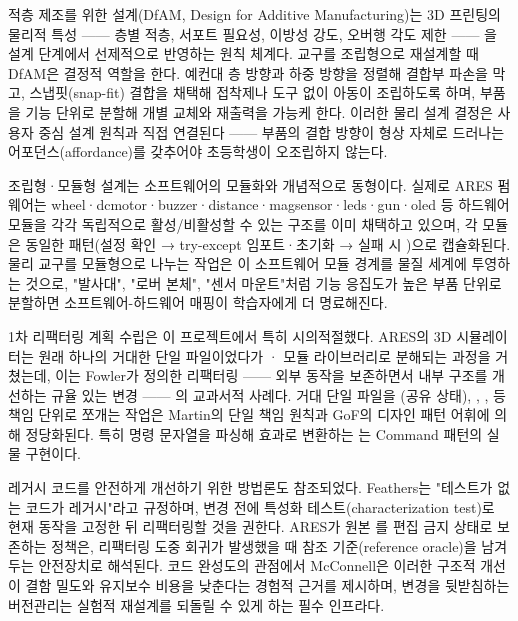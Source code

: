 적층 제조를 위한 설계(DfAM, Design for Additive Manufacturing)는 3D 프린팅의 물리적 특성 —— 층별 적층, 서포트 필요성, 이방성 강도, 오버행 각도 제한 —— 을 설계 단계에서 선제적으로 반영하는 원칙 체계다. 교구를 조립형으로 재설계할 때 DfAM은 결정적 역할을 한다. 예컨대 층 방향과 하중 방향을 정렬해 결합부 파손을 막고, 스냅핏(snap-fit) 결합을 채택해 접착제나 도구 없이 아동이 조립하도록 하며, 부품을 기능 단위로 분할해 개별 교체와 재출력을 가능케 한다. 이러한 물리 설계 결정은 사용자 중심 설계 원칙\cite{norman2013design}과 직접 연결된다 —— 부품의 결합 방향이 형상 자체로 드러나는 어포던스(affordance)를 갖추어야 초등학생이 오조립하지 않는다.

조립형·모듈형 설계는 소프트웨어의 모듈화와 개념적으로 동형이다. 실제로 ARES 펌웨어는 wheel·dcmotor·buzzer·distance·magsensor·leds·gun·oled 등 하드웨어 모듈을 각각 독립적으로 활성/비활성할 수 있는 구조를 이미 채택하고 있으며\cite{ares-repo}, 각 모듈은 동일한 패턴(설정 확인 → try-except 임포트·초기화 → 실패 시 )으로 캡슐화된다. 물리 교구를 모듈형으로 나누는 작업은 이 소프트웨어 모듈 경계를 물질 세계에 투영하는 것으로, "발사대", "로버 본체", "센서 마운트"처럼 기능 응집도가 높은 부품 단위로 분할하면 소프트웨어-하드웨어 매핑이 학습자에게 더 명료해진다.

1차 리팩터링 계획 수립은 이 프로젝트에서 특히 시의적절했다. ARES의 3D 시뮬레이터는 원래 하나의 거대한  단일 파일이었다가 · 모듈 라이브러리로 분해되는 과정을 거쳤는데\cite{ares-repo}, 이는 Fowler가 정의한 리팩터링 —— 외부 동작을 보존하면서 내부 구조를 개선하는 규율 있는 변경 —— 의 교과서적 사례다\cite{fowler2018refactoring}. 거대 단일 파일을 (공유 상태), , ,  등 책임 단위로 쪼개는 작업은 Martin의 단일 책임 원칙\cite{martin2008cleancode}과 GoF의 디자인 패턴 어휘\cite{gof1994}에 의해 정당화된다. 특히 명령 문자열을 파싱해 효과로 변환하는 는 Command 패턴의 실물 구현이다.

레거시 코드를 안전하게 개선하기 위한 방법론도 참조되었다. Feathers는 "테스트가 없는 코드가 레거시"라고 규정하며, 변경 전에 특성화 테스트(characterization test)로 현재 동작을 고정한 뒤 리팩터링할 것을 권한다\cite{feathers2004legacy}. ARES가 원본 를 편집 금지 상태로 보존하는 정책\cite{ares-repo}은, 리팩터링 도중 회귀가 발생했을 때 참조 기준(reference oracle)을 남겨두는 안전장치로 해석된다. 코드 완성도의 관점에서 McConnell은 이러한 구조적 개선이 결함 밀도와 유지보수 비용을 낮춘다는 경험적 근거를 제시하며\cite{mcconnell2004codecomplete}, 변경을 뒷받침하는 버전관리\cite{chacon2014progit}는 실험적 재설계를 되돌릴 수 있게 하는 필수 인프라다.

